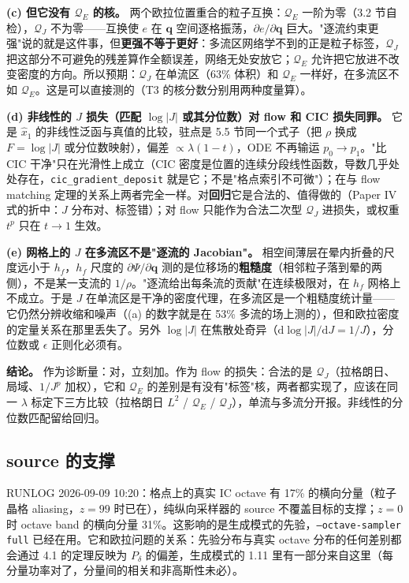 \documentclass[11pt,UTF8,fontset=none]{ctexart}
\newcommand{\q}{\mathbf{q}}
\newcommand{\dd}{\mathrm{d}}
\newcommand{\Pd}{P_\delta}
\newcommand{\QE}{\mathcal Q_E}
\begin{document}
\textbf{(c) 但它没有 $\QE$ 的核。} 两个欧拉位置重合的粒子互换：$\QE$ 一阶为零（3.2 节自检），$\mathcal Q_J$ 不为零——互换使 $e$ 在 $\q$ 空间逐格振荡，$\partial e/\partial\q$ 巨大。"逐流约束更强"说的就是这件事，但\textbf{更强不等于更好}：多流区网络学不到的正是粒子标签，$\mathcal Q_J$ 把这部分不可避免的残差算作全额误差，网络无处安放它；$\QE$ 允许把它放进不改变密度的方向。所以预期：$\mathcal Q_J$ 在单流区（63\% 体积）和 $\QE$ 一样好，在多流区不如 $\QE$。这是可以直接测的（T3 的核分数分别用两种度量算）。

\textbf{(d) 非线性的 $J$ 损失（匹配 $\log|J|$ 或其分位数）对 flow 和 CIC 损失同罪。} 它是 $\hat x_1$ 的非线性泛函与真值的比较，驻点是 5.5 节同一个式子（把 $\rho$ 换成 $F=\log|J|$ 或分位数映射），偏差 $\propto\lambda(1-t)$，ODE 不再输运 $p_0\to p_1$。"比 CIC 干净"只在光滑性上成立（CIC 密度是位置的连续分段线性函数，导数几乎处处存在，\texttt{cic\_gradient\_deposit} 就是它；不是"格点索引不可微"）；在与 flow matching 定理的关系上两者完全一样。对\textbf{回归}它是合法的、值得做的（Paper IV 式的折中：$J$ 分布对、标签错）；对 flow 只能作为合法二次型 $\mathcal Q_J$ 进损失，或权重 $t^p$ 只在 $t\to1$ 生效。

\textbf{(e) 网格上的 $J$ 在多流区不是"逐流的 Jacobian"。} 相空间薄层在晕内折叠的尺度远小于 $h_f$，$h_f$ 尺度的 $\partial\Psi/\partial\q$ 测的是位移场的\textbf{粗糙度}（相邻粒子落到晕的两侧），不是某一支流的 $1/\rho$。"逐流给出每条流的贡献"在连续极限对，在 $h_f$ 网格上不成立。于是 $J$ 在单流区是干净的密度代理，在多流区是一个粗糙度统计量——它仍然分辨收缩和噪声（(a) 的数字就是在 53\% 多流的场上测的），但和欧拉密度的定量关系在那里丢失了。另外 $\log|J|$ 在焦散处奇异（$\dd\log|J|/\dd J=1/J$），分位数或 $\epsilon$ 正则化必须有。

\textbf{结论。} 作为诊断量：对，立刻加。作为 flow 的损失：合法的是 $\mathcal Q_J$（拉格朗日、局域、$1/J^p$ 加权），它和 $\QE$ 的差别是有没有"标签"核，两者都实现了，应该在同一 $\lambda$ 标定下三方比较（拉格朗日 $L^2$ / $\QE$ / $\mathcal Q_J$），单流与多流分开报。非线性的分位数匹配留给回归。

\subsection{source 的支撑}
RUNLOG 2026-09-09 10:20：格点上的真实 IC octave 有 17\% 的横向分量（粒子晶格 aliasing，$z=99$ 时已在），纯纵向采样器的 source 不覆盖目标的支撑；$z=0$ 时 octave band 的横向分量 31\%。这影响的是生成模式的先验，\texttt{--octave-sampler full} 已经在用。它和欧拉问题的关系：先验分布与真实 octave 分布的任何差别都会通过 4.1 的定理反映为 $\Pd$ 的偏差，生成模式的 1.11 里有一部分来自这里（每分量功率对了，分量间的相关和非高斯性未必）。
\end{document}
